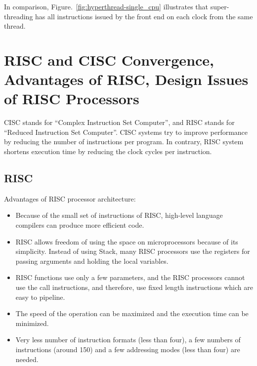 \documentclass[doc,natbib,12pt]{apa6}
\begin{document}
	In comparison, Figure.~\vref{fig:hyperthread-single_cpu} illustrates that super-threading has all instructions issued by the front end on each clock from the same thread.
	
	
	
	\newpage
	\section{RISC and CISC Convergence, Advantages of RISC, Design Issues of RISC Processors} \label{chp:RISCvsCISC} 
	
	CISC stands for ``Complex Instruction Set Computer'', and RISC stands for ``Reduced Instruction Set Computer''. CISC systems try to improve performance by reducing the number of instructions per program. In contrary, RISC system shortens execution time by reducing the clock cycles per instruction. 
	
	\subsection{RISC}
	
	Advantages of RISC processor architecture:  \citep{elprocus}
	\begin{itemize}
		\item Because of the small set of instructions of RISC, high-level language compilers can produce more efficient code.
		\item RISC allows freedom of using the space on microprocessors because of its simplicity.
		Instead of using Stack, many RISC processors use the registers for passing arguments and holding the local variables.
		\item RISC functions use only a few parameters, and the RISC processors cannot use the call instructions, and therefore, use fixed length instructions which are easy to pipeline.
		\item The speed of the operation can be maximized and the execution time can be minimized.
		\item Very less number of instruction formats (less than four), a few numbers of instructions (around 150) and a few addressing modes (less than four) are needed.
	\end{itemize}
	
\end{document}
